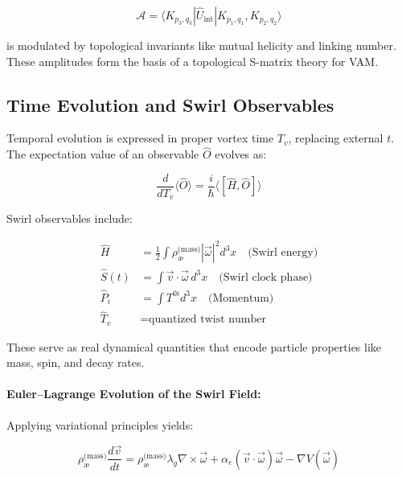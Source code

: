 \documentclass[12pt]{article}
\begin{document}
    \begin{equation}
    \mathcal{A} = \langle K_{p_3,q_3} | \hat{U}_{\text{int}} | K_{p_1,q_1}, K_{p_2,q_2} \rangle
    \end{equation}

    is modulated by topological invariants like mutual helicity and linking number. These amplitudes form the basis of a topological S-matrix theory for VAM.

    \subsection{Time Evolution and Swirl Observables}

    Temporal evolution is expressed in proper vortex time \( T_v \), replacing external \( t \). The expectation value of an observable \( \hat{O} \) evolves as:

    \begin{equation}
    \frac{d}{dT_v} \langle \hat{O} \rangle = \frac{i}{\hbar} \langle [\hat{H}, \hat{O}] \rangle
    \end{equation}

    Swirl observables include:

    \begin{align}
    \hat{H} &= \frac{1}{2} \int \rho_{\text{\ae}}^{\text{(mass)}} |\vec{\omega}|^2 d^3x \quad \text{(Swirl energy)} \\
    \hat{S}(t) &= \int \vec{v} \cdot \vec{\omega} \, d^3x \quad \text{(Swirl clock phase)} \\
    \hat{P}_i &= \int T^{0i} d^3x \quad \text{(Momentum)} \\
    \hat{T}_v &= \text{quantized twist number}
    \end{align}

    These serve as real dynamical quantities that encode particle properties like mass, spin, and decay rates.

    \paragraph{Euler–Lagrange Evolution of the Swirl Field:}
    Applying variational principles yields:

    \[
    \rho_{\text{\ae}}^{\text{(mass)}} \frac{d\vec{v}}{dt} = \rho_{\text{\ae}}^{\text{(mass)}} \lambda_g \nabla \times \vec{\omega} + \alpha_e (\vec{v} \cdot \vec{\omega}) \vec{\omega} - \nabla V(\vec{\omega})
        \label{eq:euler_lagrange_swirl}
    \]
\end{document}
